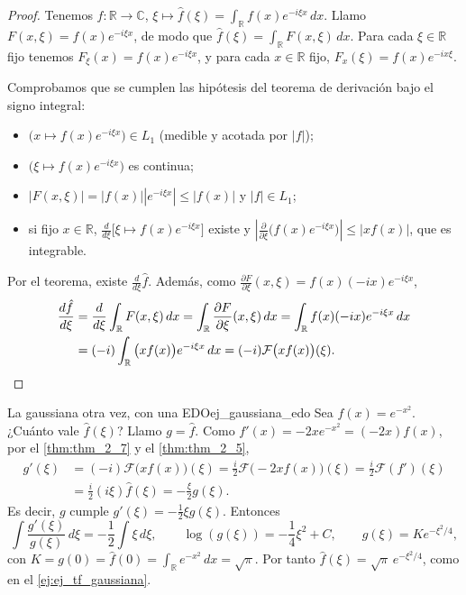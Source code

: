 \begin{proof}
Tenemos $\hat{f} : \mathbb{R} \to \mathbb{C}$, $\xi \mapsto \hat{f}(\xi) = \int_{\mathbb{R}}f(x)e^{-i\xi x}\,dx$. Llamo $F(x, \xi) = f(x)e^{-i\xi x}$, de modo que $\hat{f}(\xi) = \int_{\mathbb{R}}F(x, \xi)\,dx$. Para cada $\xi \in \mathbb{R}$ fijo tenemos $F_\xi(x) = f(x)e^{-i\xi x}$, y para cada $x \in \mathbb{R}$ fijo, $F_x(\xi) = f(x)e^{-ix\xi}$.

Comprobamos que se cumplen las hipótesis del teorema de derivación bajo el signo integral:
\begin{itemize}
\item $\big(x \mapsto f(x)e^{-i\xi x}\big) \in L_1$ (medible y acotada por $|f|$);
\item $\big(\xi \mapsto f(x)e^{-i\xi x}\big)$ es continua;
\item $|F(x, \xi)| = |f(x)||e^{-i\xi x}| \le |f(x)|$ y $|f| \in L_1$;
\item si fijo $x \in \mathbb{R}$, $\frac{d}{d\xi}\big[\xi \mapsto f(x)e^{-i\xi x}\big]$ existe y $\left|\frac{\partial}{\partial\xi}\big(f(x)e^{-i\xi x}\big)\right| \le |xf(x)|$, que es integrable.
\end{itemize}
Por el teorema, existe $\frac{d}{d\xi}\hat{f}$. Además, como $\frac{\partial F}{\partial\xi}(x, \xi) = f(x)(-ix)e^{-i\xi x}$,
\begin{align*}
\frac{d\hat{f}}{d\xi} &= \frac{d}{d\xi}\int_{\mathbb{R}}F(x, \xi)\,dx = \int_{\mathbb{R}}\frac{\partial F}{\partial\xi}(x, \xi)\,dx = \int_{\mathbb{R}}f(x)(-ix)e^{-i\xi x}\,dx \\
&= (-i)\int_{\mathbb{R}}\big(xf(x)\big)e^{-i\xi x}\,dx = (-i)\mathcal{F}\big(xf(x)\big)(\xi). \qedhere
\end{align*}
\end{proof}

\begin{ejemplo}{La gaussiana otra vez, con una EDO}{ej_gaussiana_edo}
Sea $f(x) = e^{-x^2}$. ¿Cuánto vale $\hat{f}(\xi)$? Llamo $g = \hat{f}$. Como $f'(x) = -2xe^{-x^2} = (-2x)f(x)$, por el \cref{thm:thm_2_7} y el \cref{thm:thm_2_5},
\begin{align*}
g'(\xi) &= (-i)\mathcal{F}\big(xf(x)\big)(\xi) = \frac{i}{2}\mathcal{F}\big(-2xf(x)\big)(\xi) = \frac{i}{2}\mathcal{F}(f')(\xi) \\
&= \frac{i}{2}(i\xi)\hat{f}(\xi) = -\frac{\xi}{2}g(\xi).
\end{align*}
Es decir, $g$ cumple $g'(\xi) = -\frac{1}{2}\xi g(\xi)$. Entonces
\[
\int\frac{g'(\xi)}{g(\xi)}\,d\xi = -\frac{1}{2}\int\xi\,d\xi, \qquad \log(g(\xi)) = -\frac{1}{4}\xi^2 + C, \qquad g(\xi) = Ke^{-\xi^2/4},
\]
con $K = g(0) = \hat{f}(0) = \int_{\mathbb{R}}e^{-x^2}\,dx = \sqrt{\pi}$. Por tanto $\hat{f}(\xi) = \sqrt{\pi}\,e^{-\xi^2/4}$, como en el \cref{ej:ej_tf_gaussiana}.
\end{ejemplo}

